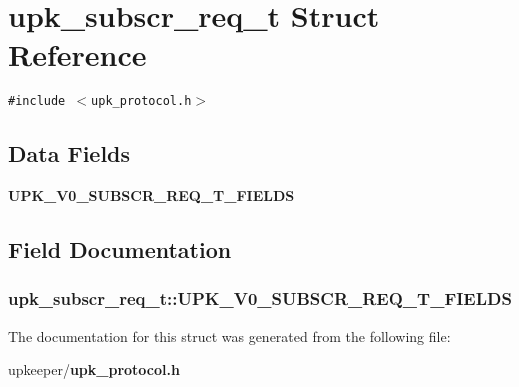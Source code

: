 \section{upk\_\-subscr\_\-req\_\-t Struct Reference}
\label{structupk__subscr__req__t}
{\tt \#include $<$upk\_\-protocol.h$>$}

\subsection*{Data Fields}
\begin{CompactItemize}
\item 
\bf{UPK\_\-V0\_\-SUBSCR\_\-REQ\_\-T\_\-FIELDS}
\end{CompactItemize}


\subsection{Field Documentation}
\subsubsection{\setlength{\rightskip}{0pt plus 5cm}\bf{upk\_\-subscr\_\-req\_\-t::UPK\_\-V0\_\-SUBSCR\_\-REQ\_\-T\_\-FIELDS}}\label{structupk__subscr__req__t_2ba45df4766519f2739bfa2e1b243ad5}




The documentation for this struct was generated from the following file:\begin{CompactItemize}
\item 
upkeeper/\bf{upk\_\-protocol.h}\end{CompactItemize}
